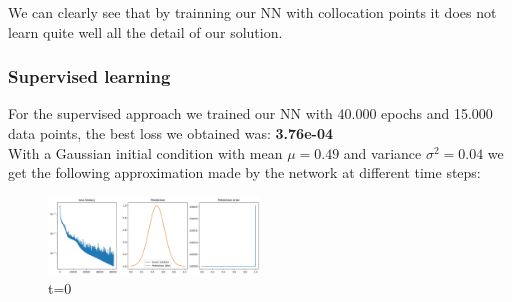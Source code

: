 \documentclass{article}
\begin{document}
We can clearly see that by trainning our NN with collocation points it does not learn quite well all the detail of our solution. 

\subsubsection{Supervised learning}
For the supervised approach we trained our NN with 40.000 epochs and 15.000 data points, the best loss we obtained was: \textbf{3.76e-04} \\

With a Gaussian initial condition with mean $\mu = 0.49$ and variance $\sigma^2 = 0.04$ we get the following approximation made by the network at different time steps:\\

\begin{figure}[!h]
    \centering
    \includegraphics[width=0.5\textwidth]{images/data1.png}
    \caption{t=0}
\end{figure}
\end{document}
